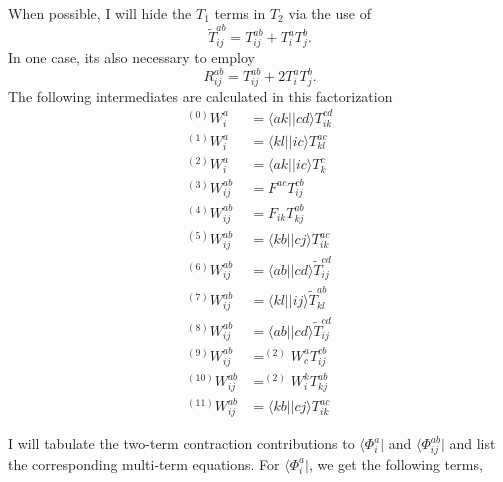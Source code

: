 \documentclass[letterpaper,12pt]{article}
\newcommand{\ket}[1]{\lvert #1 \rangle}
\newcommand{\bra}[1]{\langle #1 \vert}
\begin{document}
When possible, I will hide the $T_1$ terms in $T_2$ via the use of
$$\tilde{T}^{ab}_{ij}=T^{ab}_{ij}+T^a_iT^b_j.$$
In one case, its also necessary to employ
$$R^{ab}_{ij}=T^{ab}_{ij}+2T^a_iT^b_j.$$
The following intermediates are calculated in this factorization
\begin{align*}
^{(0)}W^a_i &= \bra{ak}\ket{cd}T^{cd}_{ik} \\
^{(1)}W^a_i &= \bra{kl}\ket{ic}T^{ac}_{kl} \\
^{(2)}W^a_i &= \bra{ak}\ket{ic}T^{c}_{k} \\
^{(3)}W^{ab}_{ij} &= F^{ac}T^{cb}_{ij} \\
^{(4)}W^{ab}_{ij} &= F_{ik}T^{ab}_{kj} \\
^{(5)}W^{ab}_{ij} &= \bra{kb}\ket{cj}T^{ac}_{ik} \\
^{(6)}W^{ab}_{ij} &= \bra{ab}\ket{cd}\tilde{T}^{cd}_{ij} \\
^{(7)}W^{ab}_{ij} &= \bra{kl}\ket{ij}\tilde{T}^{ab}_{kl} \\
^{(8)}W^{ab}_{ij} &= \bra{ab}\ket{cd}\tilde{T}^{cd}_{ij} \\
^{(9)}W^{ab}_{ij} &= ^{(2)}W^a_cT^{cb}_{ij} \\
^{(10)}W^{ab}_{ij} &= ^{(2)}W^k_iT^{ab}_{kj} \\
^{(11)}W^{ab}_{ij} &= \bra{kb}\ket{cj}T^{ac}_{ik}
\end{align*}

\newpage

I will tabulate the two-term contraction contributions to $\bra{\Phi^a_i}$
and $\bra{\Phi^{ab}_{ij}}$ and list the corresponding multi-term equations.
For $\bra{\Phi^a_i}$, we get the following terms,
\end{document}
